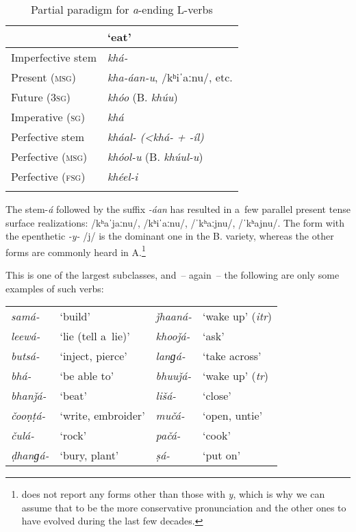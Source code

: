 \begin{table}[ht]
\caption{Partial paradigm for \textit{a}-ending L-verbs}
\begin{tabularx}{.75\textwidth}{ Q Q }
\lsptoprule
&
`eat'\\\hline
Imperfective stem &
\textit{khá-} \\
Present (\textsc{msg}) &
\textit{kha-áan-u}, /kʰiˈaːnu/, etc.\\
Future (\textsc{3sg}) &
\textit{khóo} (B. \textit{khúu})\\
Imperative (\textsc{sg}) &
\textit{khá} \\
Perfective stem &
\textit{kháal- ({\textless}khá- + -íl)}\\
Perfective (\textsc{msg}) &
\textit{khóol-u} (B. \textit{khúul-u})\\
Perfective (\textsc{fsg}) &
\textit{khéel-i} \\\lspbottomrule
\end{tabularx}
\label{tab:8-5}
\end{table}


The stem-\textit{á} followed by the suffix \textit{-áan} has resulted in a~few parallel present tense surface realizations: /kʰaˈjaːnu/, /kʰiˈaːnu/, /ˈkʰaːjnu/, /ˈkʰajnu/. The form with the epenthetic \textit{-y-} /j/ is the dominant one in the B. variety, whereas the other forms are commonly heard in A.\footnote{\citet[22]{morgenstierne1941} does not report any forms other than those with \textit{y}, which is why we can assume that to be the more conservative pronunciation and the other ones to have evolved during the last few decades.} 


This is one of the largest subclasses, and~-- again~-- the following are only some examples of such verbs:


\begin{table}[H]
\begin{tabularx}{\textwidth}{ l@{\hspace{20pt}} Q l@{\hspace{20pt}} Q }
\textit{samá-} &
`build' &
\textit{ǰhaaná-} &
`wake up' (\textit{itr})\\
\textit{leewá-} &
`lie (tell a~lie)' &
\textit{khooǰá-} &
`ask'\\
\textit{butsá-} &
`inject, pierce' &
\textit{lanɡá-} &
`take across'\\
\textit{bhá-} &
`be able to' &
\textit{bhuuǰá-} &
`wake up' (\textit{tr})\\
\textit{bhanǰá-} &
`beat' &
\textit{lišá-} &
`close'\\
\textit{čooṇṭá-} &
`write, embroider' &
\textit{mučá-} &
`open, untie'\\
\textit{čulá-} &
`rock' &
\textit{pačá-} &
`cook'\\
\textit{ḍhanɡá-} &
`bury, plant' &
\textit{ṣá-} &
`put on'\\
\end{tabularx}
\end{table}

